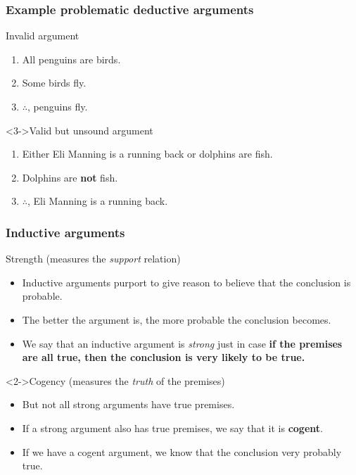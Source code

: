 \documentclass[10pt,letterpaper,xcolor=dvipsnames,handout]{beamer}
\begin{document}
\begin{frame}
  \frametitle{Example problematic deductive arguments}
  
  \begin{block}{Invalid argument}
  \begin{enumerate}
    \item All penguins are birds. \uncover<2->{\textcolor{red}{(True)}}
    \item Some birds fly. 
    \item $\therefore$, penguins fly. 
  \end{enumerate}
  \end{block}
  
  \begin{block}<3->{Valid but unsound argument }
  \begin{enumerate}
    \item Either Eli Manning is a running back or dolphins are fish. 
    \item Dolphins are \textbf{not} fish. 
    \item $\therefore$, Eli Manning is a running back. 
  \end{enumerate}
  \end{block}
\end{frame}

\begin{frame}
\frametitle{Inductive arguments}

\begin{block}{Strength (measures the \textit{support} relation)}
\begin{itemize}
  \item Inductive arguments purport to give reason to believe that the conclusion is probable.
  \item The better the argument is, the more probable the conclusion becomes.
  \item We say that an inductive argument is \textit{strong} just in case \textbf{if the premises are all true, then the conclusion is very likely to be true.}
\end{itemize}
\end{block}

\begin{block}<2->{Cogency (measures the \textit{truth} of the premises)}
\begin{itemize}
  \item But not all strong arguments have true premises.
  \item If a strong argument also has true premises, we say that it is \textbf{cogent}.
  \item If we have a cogent argument, we know that the conclusion very probably true.
\end{itemize}
\end{block}

\end{frame}
\end{document}
